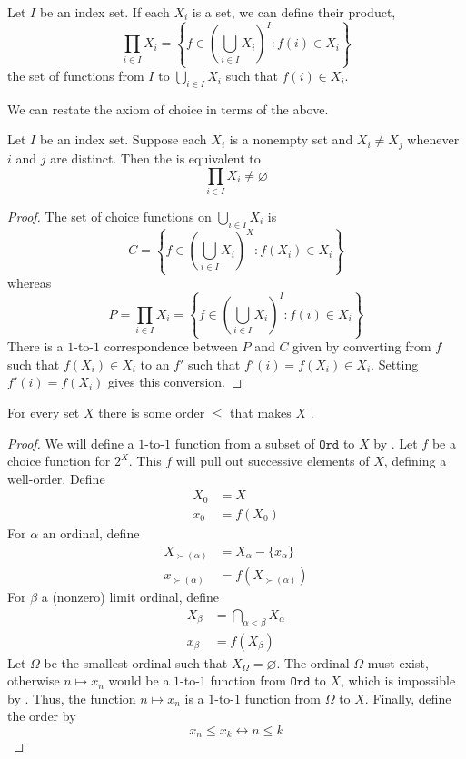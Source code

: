 \message{ !name(truth.tex)}\documentclass{scrbook}
\renewcommand{\iff}{\leftrightarrow}
\newcommand{\ord}{\texttt{Ord}}
\renewcommand{\emptyset}{\varnothing}
\begin{document}
\begin{defn}
  Let $I$ be an index set. If each $X_i$ is a set, we can define their product,
  \[
  \prod_{i\in I} X_i=\left\{f\in\left(\bigcup_{i\in I} X_i\right)^I: f(i)\in X_i\right\}
  \]
  \ie the set of functions from $I$ to $\bigcup_{i\in I} X_i$ such that $f(i)\in X_i$. 
\end{defn}
We can restate the axiom of choice in terms of the above.
\begin{theorem}
  Let $I$ be an index set. Suppose each $X_i$ is a nonempty set and $X_i\neq X_j$ whenever $i$ and $j$ are distinct. Then the  is equivalent to
  \begin{equation}
    \prod_{i\in I} X_i\neq \emptyset
    \label{eq:nonempty-prod}
  \end{equation}
\end{theorem}
\begin{proof}
The set of choice functions on $\bigcup_{i\in I} X_i$ is 
  \[
  C=\left\{f\in \left(\bigcup_{i\in I} X_i\right)^X: f(X_i)\in X_i\right\}
  \]
  whereas
  \[
  P=\prod_{i\in I} X_i = \left\{f\in\left(\bigcup_{i\in I} X_i\right)^I: f(i) \in X_i\right\}
  \]
  There is a $1$-to-$1$ correspondence between $P$ and $C$ given by converting from $f$ such that $f(X_i)\in X_i$ to an $f'$ such that $f'(i)=f(X_i)\in X_i$. Setting $f'(i)=f(X_i)$ gives this conversion.
\end{proof}

\begin{theorem}\label{th:well-ordering}
  For every set $X$ there is some order $\leq$ that makes $X$ . 
\end{theorem}
\begin{proof}
  We will define a $1$-to-$1$ function from a subset of $\ord$ to $X$ by . Let $f$ be a choice function for $2^X$. This $f$ will pull out successive elements of $X$,  defining a well-order. Define
  \begin{align*}
    X_0 &= X \\
    x_0 &= f(X_0)
  \end{align*}
  For $\alpha$ an ordinal, define 
  \begin{align*}
    X_{\succ(\alpha)} &= X_\alpha-\{x_\alpha\} \\
    x_{\succ(\alpha)} &= f(X_{\succ(\alpha)})
  \end{align*}
  For $\beta$ a (nonzero) limit ordinal, define 
  \begin{align*}
    X_\beta &= \bigcap_{\alpha < \beta} X_\alpha \\
    x_\beta &=f(X_\beta)
  \end{align*}
  Let $\Omega$ be the smallest ordinal such that $X_\Omega=\emptyset$. The ordinal $\Omega$ must exist, otherwise $n\mapsto x_n$ would be a $1$-to-$1$ function from $\ord$ to $X$, which is impossible by . Thus, the function $n\mapsto x_n$ is a $1$-to-$1$ function from $\Omega$ to $X$. Finally, define the order by 
  \[
  x_n \leq x_k \iff n \leq k
  \]
\end{proof}
\end{document}
